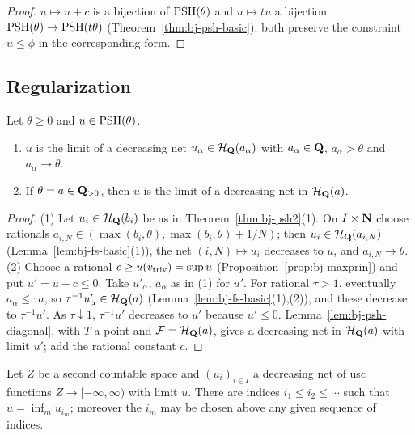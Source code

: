 \begin{proof}
$u\mapsto u+c$ is a bijection of $\operatorname{PSH}(\theta)$ and $u\mapsto tu$ a bijection
$\operatorname{PSH}(\theta)\to\operatorname{PSH}(t\theta)$ (Theorem~\ref{thm:bj-psh-basic}); both preserve the constraint $u\le\phi$
in the corresponding form.
\end{proof}

\subsection{Regularization}

\begin{theorem}\label{thm:bj-regularization}
\leanok
{}
Let $\theta\ge0$ and $u\in\operatorname{PSH}(\theta)$.
\begin{enumerate}
\item $u$ is the limit of a decreasing net $u_\alpha\in\mathcal H_{\mathbf{Q}}(a_\alpha)$ with $a_\alpha\in\mathbf{Q}$,
$a_\alpha>\theta$ and $a_\alpha\to\theta$.
\item If $\theta=a\in\mathbf{Q}_{>0}$, then $u$ is the limit of a decreasing net in $\mathcal H_{\mathbf{Q}}(a)$.
\end{enumerate}
\end{theorem}

\begin{proof}
(1) Let $u_i\in\mathcal H_{\mathbf{Q}}(b_i)$ be as in Theorem~\ref{thm:bj-psh2}(1). On $I\times\mathbf{N}$ choose rationals
$a_{i,N}\in(\max(b_i,\theta),\max(b_i,\theta)+1/N)$; then $u_i\in\mathcal H_{\mathbf{Q}}(a_{i,N})$
(Lemma~\ref{lem:bj-fs-basic}(1)), the net $(i,N)\mapsto u_i$ decreases to $u$, and $a_{i,N}\to\theta$.
(2) Choose a rational $c\ge u(v_{\mathrm{triv}})=\sup u$ (Proposition~\ref{prop:bj-maxprin}) and put $u'=u-c\le0$.
Take $u'_\alpha$, $a_\alpha$ as in (1) for $u'$. For rational $\tau>1$, eventually $a_\alpha\le\tau a$, so
$\tau^{-1}u'_\alpha\in\mathcal H_{\mathbf{Q}}(a)$ (Lemma~\ref{lem:bj-fs-basic}(1),(2)), and these decrease to
$\tau^{-1}u'$. As $\tau\downarrow1$, $\tau^{-1}u'$ decreases to $u'$ because $u'\le0$.
Lemma~\ref{lem:bj-psh-diagonal}, with $T$ a point and $\mathcal F=\mathcal H_{\mathbf{Q}}(a)$, gives a decreasing net
in $\mathcal H_{\mathbf{Q}}(a)$ with limit $u'$; add the rational constant $c$.
\end{proof}

\begin{lemma}\label{lem:bj-lindelof}
\leanok
Let $Z$ be a second countable space and $(u_i)_{i\in I}$ a decreasing net of usc functions
$Z\to[-\infty,\infty)$ with limit $u$. There are indices $i_1\le i_2\le\cdots$ such that
$u=\inf_mu_{i_m}$; moreover the $i_m$ may be chosen above any given sequence of indices.
\end{lemma}

